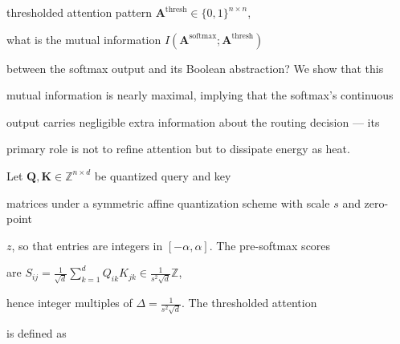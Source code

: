 thresholded attention pattern $\mathbf{A}^{\text{thresh}} \in \{0,1\}^{n \times n}$,






what is the mutual information $I(\mathbf{A}^{\text{softmax}}; \mathbf{A}^{\text{thresh}})$






between the softmax output and its Boolean abstraction? We show that this






mutual information is nearly maximal, implying that the softmax's continuous






output carries negligible extra information about the routing decision — its






primary role is not to refine attention but to dissipate energy as heat.













Let $\mathbf{Q}, \mathbf{K} \in \mathbb{Z}^{n \times d}$ be quantized query and key






matrices under a symmetric affine quantization scheme with scale $s$ and zero-point






$z$, so that entries are integers in $[-\alpha, \alpha]$. The pre-softmax scores






are $S_{ij} = \frac{1}{\sqrt{d}} \sum_{k=1}^d Q_{ik} K_{jk} \in \frac{1}{s^2\sqrt{d}} \mathbb{Z}$,






hence integer multiples of $\Delta = \frac{1}{s^2\sqrt{d}}$. The thresholded attention






is defined as






